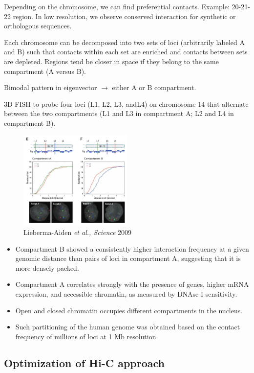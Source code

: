 Depending on the chromosome, we can find preferential contacts. Example: 20-21-22 region. In low resolution, we observe conserved interaction for synthetic or orthologous sequences.

Each chromosome can be decomposed into two sets of loci (arbitrarily labeled A and B) such that contacts within each set are enriched and contacts between sets are depleted. Regions tend be closer in space if they belong to the same compartment (A versus B).

Bimodal pattern in eigenvector $\rightarrow$ either A or B compartment.

3D-FISH to probe four loci (L1, L2, L3, andL4) on chromosome 14 that alternate between the two compartments (L1 and L3 in compartment A; L2 and L4 in compartment B).

\begin{figure}
\centering
\includegraphics[width=0.5\textwidth]{../_resources/Screenshot_2022-10-19_at_09-06-00.png}
\caption{Lieberma-Aiden \emph{et al., Science} 2009}
\end{figure}

\begin{itemize}
\tightlist
\item
  Compartment B showed a consistently higher interaction frequency at a given genomic distance than pairs of loci in compartment A, suggesting that it is more densely packed.
\item
  Compartment A correlates strongly with the presence of genes, higher mRNA expression, and accessible chromatin, as measured by DNAse I sensitivity.
\item
  Open and closed chromatin occupies different compartments in the nucleus.
\item
  Such partitioning of the human genome was obtained based on the contact frequency of millions of loci at 1 Mb resolution.
\end{itemize}

\hypertarget{optimization-of-hi-c-approach}{%
\subsection{Optimization of Hi-C approach}\label{optimization-of-hi-c-approach}}

